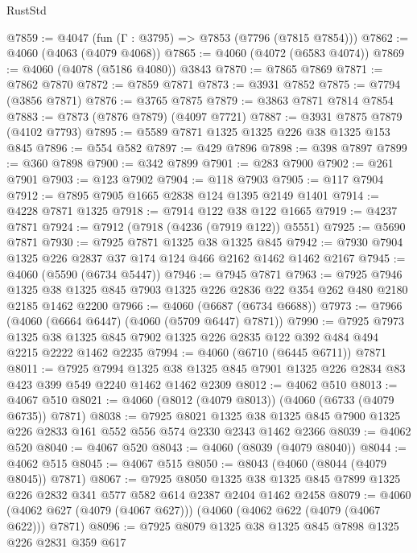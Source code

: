 \begin{lexlean}{RustStd}
\begin{coremodule}
@7859 := @4047 (fun (Γ : @3795) => @7853 (@7796 (@7815 @7854)))
@7862 := @4060 (@4063 (@4079 @4068))
@7865 := @4060 (@4072 (@6583 @4074))
@7869 := @4060 (@4078 (@5186 @4080)) @3843
@7870 := @7865 @7869
@7871 := @7862 @7870
@7872 := @7859 @7871
@7873 := @3931 @7852
@7875 := @7794 (@3856 @7871)
@7876 := @3765 @7875
@7879 := @3863 @7871 @7814 @7854
@7883 := @7873 (@7876 @7879) (@4097 @7721)
@7887 := @3931 @7875 @7879 (@4102 @7793)
@7895 := @5589 @7871 @1325 @1325 @226 @38 @1325 @153 @845
@7896 := @554 @582
@7897 := @429 @7896
@7898 := @398 @7897
@7899 := @360 @7898
@7900 := @342 @7899
@7901 := @283 @7900
@7902 := @261 @7901
@7903 := @123 @7902
@7904 := @118 @7903
@7905 := @117 @7904
@7912 := @7895 @7905 @1665 @2838 @124 @1395 @2149 @1401
@7914 := @4228 @7871 @1325
@7918 := @7914 @122 @38 @122 @1665
@7919 := @4237 @7871
@7924 := @7912 (@7918 (@4236 (@7919 @122)) @5551)
@7925 := @5690 @7871
@7930 := @7925 @7871 @1325 @38 @1325 @845
@7942 := @7930 @7904 @1325 @226 @2837 @37 @174 @124 @466 @2162 @1462 @1462 @2167
@7945 := @4060 (@5590 (@6734 @5447))
@7946 := @7945 @7871
@7963 := @7925
    @7946
    @1325
    @38
    @1325
    @845
    @7903
    @1325
    @226
    @2836
    @22
    @354
    @262
    @480
    @2180
    @2185
    @1462
    @2200
@7966 := @4060 (@6687 (@6734 @6688))
@7973 := @7966 (@4060 (@6664 @6447) (@4060 (@5709 @6447) @7871))
@7990 := @7925
    @7973
    @1325
    @38
    @1325
    @845
    @7902
    @1325
    @226
    @2835
    @122
    @392
    @484
    @494
    @2215
    @2222
    @1462
    @2235
@7994 := @4060 (@6710 (@6445 @6711)) @7871
@8011 := @7925
    @7994
    @1325
    @38
    @1325
    @845
    @7901
    @1325
    @226
    @2834
    @83
    @423
    @399
    @549
    @2240
    @1462
    @1462
    @2309
@8012 := @4062 @510
@8013 := @4067 @510
@8021 := @4060 (@8012 (@4079 @8013)) (@4060 (@6733 (@4079 @6735)) @7871)
@8038 := @7925
    @8021
    @1325
    @38
    @1325
    @845
    @7900
    @1325
    @226
    @2833
    @161
    @552
    @556
    @574
    @2330
    @2343
    @1462
    @2366
@8039 := @4062 @520
@8040 := @4067 @520
@8043 := @4060 (@8039 (@4079 @8040))
@8044 := @4062 @515
@8045 := @4067 @515
@8050 := @8043 (@4060 (@8044 (@4079 @8045)) @7871)
@8067 := @7925
    @8050
    @1325
    @38
    @1325
    @845
    @7899
    @1325
    @226
    @2832
    @341
    @577
    @582
    @614
    @2387
    @2404
    @1462
    @2458
@8079 := @4060 (@4062 @627 (@4079 (@4067 @627))) (@4060 (@4062 @622 (@4079 (@4067 @622))) @7871)
@8096 := @7925
    @8079
    @1325
    @38
    @1325
    @845
    @7898
    @1325
    @226
    @2831
    @359
    @617

\end{coremodule}
\end{lexlean}
